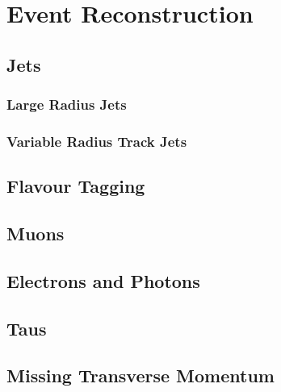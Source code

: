 \chapter{Event Reconstruction}\label{chapter:event_reconstruction}

\section{Jets}

\subsection{Large Radius Jets}

\subsection{Variable Radius Track Jets}

\section{Flavour Tagging}

\section{Muons}

\section{Electrons and Photons}

\section{Taus}

\section{Missing Transverse Momentum}
